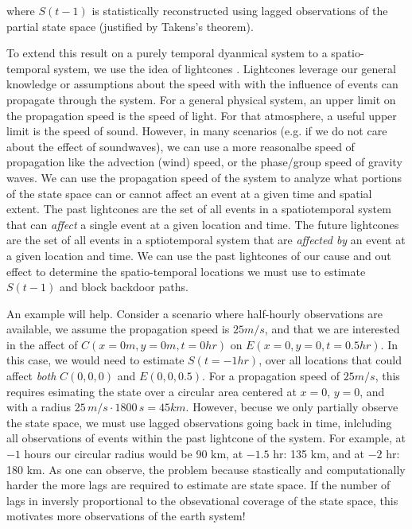\documentclass[12pt]{article}
\begin{document}
where $S(t-1)$ is statistically reconstructed using lagged
observations of the partial state space (justified by Takens's
theorem).

To extend this result on a purely temporal dyanmical system to a
spatio-temporal system, we use the idea of lightcones
\citep{PhysRevLett.84.1890,
  montanez2015licors,doi:10.1063/1.5021130}. Lightcones leverage our
general knowledge or assumptions about the speed with with the
influence of events can propagate through the system. For a general
physical system, an upper limit on the propagation speed is the speed
of light. For that atmosphere, a useful upper limit is the speed of
sound. However, in many scenarios (e.g. if we do not care about the
effect of soundwaves), we can use a more reasonalbe speed of
propagation like the advection (wind) speed, or the phase/group speed
of gravity waves. We can use the propagation speed of the system to
analyze what portions of the state space can or cannot affect an event
at a given time and spatial extent. The past lightcones are the set of
all events in a spatiotemporal system that can \textit{affect} a
single event at a given location and time. The future lightcones are
the set of all events in a sptiotemporal system that are
\textit{affected by} an event at a given location and time. We can use
the past lightcones of our cause and out effect to determine the
spatio-temporal locations we must use to estimate $S(t-1)$ and block
backdoor paths.

An example will help. Consider a scenario where half-hourly
observations are available, we assume the propagation speed is
$25 m/s$, and that we are interested in the affect of
$C(x=0 m, y=0 m, t=0 hr)$ on $E(x=0, y=0, t=0.5 hr)$. In this case, we
would need to estimate $S(t=-1 hr)$, over all locations that could
affect \emph{both} $C(0,0,0)$ and $E(0,0,0.5)$.  For a propagation
speed of $25 m/s$, this requires esimating the state over a circular
area centered at $x=0$, $y=0$, and with a radius
$25 \, m/s \cdot 1800 \, s = 45 km$. However, becuse we only partially
observe the state space, we must use lagged observations going back in
time, inlcluding all observations of events within the past lightcone
of the system. For example, at $-1$ hours our circular radius would be
90 km, at $-1.5$ hr: 135 km, and at $-2$ hr: 180 km. As one can
observe, the problem because stastically and computationally harder
the more lags are required to estimate are state space. If the number
of lags in inversly proportional to the obsevational coverage of the
state space, this motivates more observations of the earth system!
\end{document}
